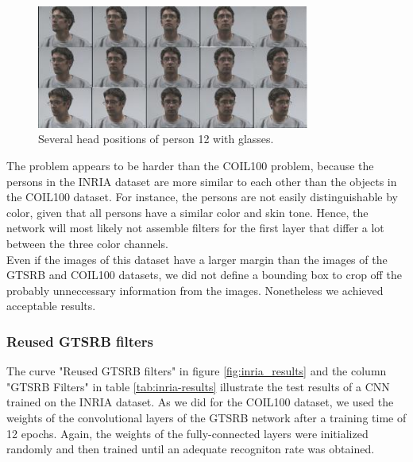 \documentclass[11pt, a4paper]{article}
\begin{document}
\begin{figure}[h!]
	\centering
	\includegraphics[width=0.8\textwidth]{inria_different_angles}
	\caption{Several head positions of person 12 with glasses.}
	\label{fig:inria_different_angles}
\end{figure}

The problem appears to be harder than the COIL100 problem, because the persons in the INRIA dataset are more similar to each other than the objects in the COIL100 dataset. For instance, the persons are not easily distinguishable by color, given that all persons have a similar color and skin tone. Hence, the network will most likely not assemble filters for the first layer that differ a lot between the three color channels.\\
Even if the images of this dataset have a larger margin than the images of the GTSRB and COIL100 datasets, we did not define a bounding box to crop off the probably unneccessary information from the images. Nonetheless we achieved acceptable results.

\subsubsection{Reused GTSRB filters}

The curve "Reused GTSRB filters" in figure \ref{fig:inria_results} and the column "GTSRB Filters" in table \ref{tab:inria-results} illustrate the test results of a CNN trained on the INRIA dataset. As we did for the COIL100 dataset, we used the weights of the convolutional layers of the GTSRB network after a training time of 12 epochs. Again, the weights of the fully-connected layers were initialized randomly and then trained until an adequate recogniton rate was obtained.
\end{document}
